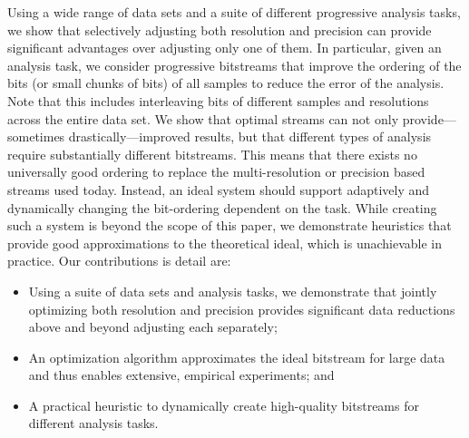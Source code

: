 Using a wide range of data sets and a suite of different progressive analysis
tasks, we show that selectively adjusting both resolution and precision can
provide significant advantages over adjusting only one of them. In
particular, given an analysis task, we consider progressive
bitstreams that improve the ordering of the bits (or small chunks of bits)
of all samples to reduce the error of the analysis. Note that this includes
interleaving bits of different samples and resolutions across the entire
data set. We show that optimal streams can not only provide---sometimes
drastically---improved results, but that different types of
analysis require substantially different bitstreams. This means that
there exists no universally good ordering to replace the
multi-resolution or precision based streams used today.
Instead, an
ideal system should support adaptively and dynamically changing the
bit-ordering dependent on the task.
While creating such a system is
beyond the scope of this paper, we demonstrate heuristics that provide
good approximations to the theoretical ideal, which is unachievable in
practice. Our contributions is detail are:

\begin{itemize}

\item Using a suite of data sets and analysis tasks, we demonstrate
  that jointly optimizing both resolution and precision provides
  significant data reductions above and beyond  adjusting each
  separately;

\item An optimization algorithm approximates the ideal
  bitstream for large data and thus enables extensive, empirical
  experiments; and

\item A practical heuristic to dynamically create
  high-quality bitstreams for different analysis tasks.

\end{itemize}

 



